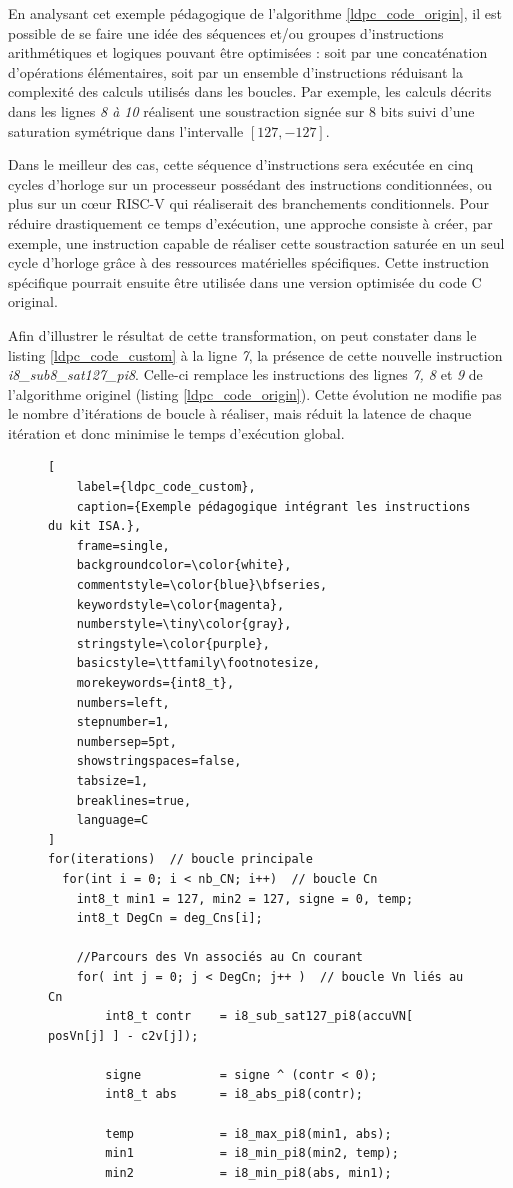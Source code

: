 \documentclass[../main.tex]{subfiles}
\begin{document}
En analysant cet exemple pédagogique de l'algorithme \ref{ldpc_code_origin}, il est possible de se faire une idée des séquences et/ou groupes d'instructions arithmétiques et logiques pouvant être optimisées : soit par une concaténation d'opérations élémentaires, soit par un ensemble d'instructions réduisant la complexité des calculs utilisés dans les boucles. 
Par exemple, les calculs décrits dans les lignes \textit{8 à 10} réalisent une soustraction signée sur 8 bits suivi d'une saturation symétrique dans l'intervalle $[127, -127]$.

Dans le meilleur des cas, cette séquence d'instructions sera exécutée en cinq cycles d'horloge sur un processeur possédant des instructions conditionnées, ou plus sur un cœur RISC-V qui réaliserait des branchements conditionnels. Pour réduire drastiquement ce temps d'exécution, une approche consiste à créer, par exemple, une instruction capable de réaliser cette soustraction saturée en un seul cycle d'horloge grâce à des ressources matérielles spécifiques. Cette instruction spécifique pourrait ensuite être utilisée dans une version optimisée du code C original.

Afin d'illustrer le résultat de cette transformation, on peut constater dans le listing \ref{ldpc_code_custom} à la ligne \textit{7}, la présence de cette nouvelle instruction \textit{i8\_sub8\_sat127\_pi8}. Celle-ci remplace les instructions des lignes \textit{7, 8} et \textit{9} de l'algorithme originel (listing \ref{ldpc_code_origin}). Cette évolution ne modifie pas le nombre d'itérations de boucle à réaliser, mais réduit la latence de chaque itération et donc minimise le temps d'exécution global.



\begin{figure}[!tb]
\begin{lstlisting}[
    label={ldpc_code_custom},      
    caption={Exemple pédagogique intégrant les instructions du kit ISA.},
    frame=single,
    backgroundcolor=\color{white},  
    commentstyle=\color{blue}\bfseries,
    keywordstyle=\color{magenta},
    numberstyle=\tiny\color{gray},
    stringstyle=\color{purple},
    basicstyle=\ttfamily\footnotesize,
    morekeywords={int8_t},
    numbers=left,
    stepnumber=1,
    numbersep=5pt,                 
    showstringspaces=false,
    tabsize=1,
    breaklines=true,
    language=C
]
for(iterations)  // boucle principale
  for(int i = 0; i < nb_CN; i++)  // boucle Cn
    int8_t min1 = 127, min2 = 127, signe = 0, temp;
    int8_t DegCn = deg_Cns[i];
      
    //Parcours des Vn associés au Cn courant 
    for( int j = 0; j < DegCn; j++ )  // boucle Vn liés au Cn
        int8_t contr    = i8_sub_sat127_pi8(accuVN[ posVn[j] ] - c2v[j]); 
      
        signe           = signe ^ (contr < 0);
        int8_t abs      = i8_abs_pi8(contr); 
     
        temp            = i8_max_pi8(min1, abs);
        min1            = i8_min_pi8(min2, temp);
        min2            = i8_min_pi8(abs, min1); 
\end{lstlisting}
\end{figure}
\end{document}
